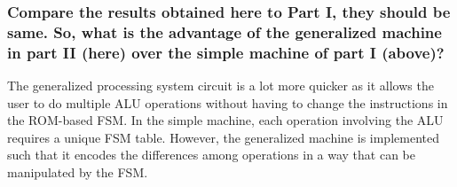 \documentclass{article}
\begin{document}
		\subsubsection{Compare the results obtained here to Part I, they should be same. So, what is the advantage of the generalized machine in part II (here) over the simple machine of part I (above)?}
		The generalized processing system circuit is a lot more quicker as it allows the user to do multiple ALU operations without having to change the instructions in the ROM-based FSM. In the simple machine, each operation involving the ALU requires a unique FSM table. However, the generalized machine is implemented such that it encodes the differences among operations in a way that can be manipulated by the FSM.
\end{document}
